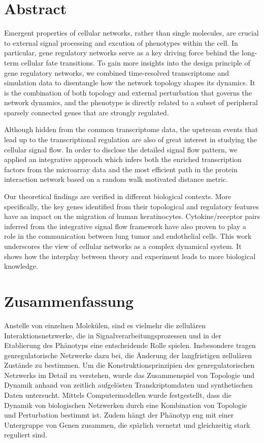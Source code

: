 \chapter*{Abstract}


Emergent properties of cellular networks, rather than single molecules, 
are crucial to external signal processing and excution of phenotypes
within the cell. In particular, gene regulatory networks serve as a key
driving force behind the long-term cellular fate transitions. To gain more
insights into the design principle of gene regulatory networks, we combined
time-resolved transcriptome and simulation data to disentangle how the
network topology shapes its dynamics. It is the combination of both topology
and external perturbation that governs the network dynamics, and 
the phenotype is directly related to a subset of
peripheral sparsely connected genes that are strongly regulated. 

Although hidden from the common transcriptome data, 
the upstream events that lead up to the 
transcriptional regulation are also of great interest in studying the 
cellular signal flow. In order to disclose the detailed signal flow pattern,
we applied an integrative approach which infers both the enriched 
transcription factors from the microarray data and the most efficient path
in the protein interaction network based on a random walk motivated distance
metric.

Our theoretical findings are verified in different biological contexts. More
specifically, the key genes identified from their topological and regulatory
features have an impact on the migration of human keratinocytes. 
Cytokine/receptor pairs inferred from the integrative signal flow framework
have also proven to play a role in the communication between lung tumor
and endothelial cells. This work underscores the view of
cellular networks as a complex dynamical system.
It shows how the interplay between theory
and experiment leads to more biological knowledge.

\chapter*{Zusammenfassung}


Anstelle von einzelnen Molek\"ulen,
sind es vielmehr die zellul\"aren Interaktionsnetzwerke,
die in Signalverarbeitungsprozessen und in der Etablierung des
Ph\"anotyps eine entscheidende Rolle spielen. 
Insbesondere tragen genregulatorische Netzwerke
dazu bei, die \"Anderung der langfristigen zellul\"aren
Zust\"ande zu bestimmen. Um die Konstruktionsprinzipien des
genregulatorischen Netzwerks im
Detail zu verstehen, wurde das Zusammenspiel von Topologie
und Dynamik anhand von zeitlich 
aufgel\"osten Transkriptomdaten und synthetischen Daten
untersucht.
Mittels Computermodellen wurde festgestellt, dass
die Dynamik von biologischen Netzwerken durch eine 
Kombination von
Topologie und Perturbation bestimmt ist.
Zudem h\"angt der Ph\"anotyp eng mit einer Untergruppe
von Genen zusammen, die sp\"arlich vernetzt und gleichzeitig
stark reguliert sind. 

